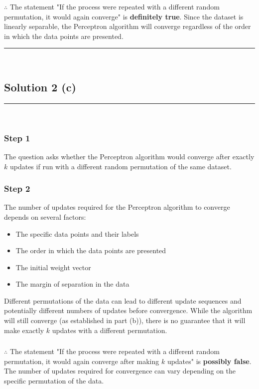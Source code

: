 \documentclass{article}
\begin{document}
\subsubsection*{\normalfont}{$\therefore$ The statement "If the process were repeated with a different random permutation, it would again converge" is \textbf{definitely true}. Since the dataset is linearly separable, the Perceptron algorithm will converge regardless of the order in which the data points are presented.}

\noindent\rule{\textwidth}{0.4pt}\\

\newpage

\subsection*{Solution 2 (c)}
\noindent\rule{\textwidth}{0.4pt}\\

\subsubsection*{Step 1}
\parbox{\textwidth}{
The question asks whether the Perceptron algorithm would converge after exactly $k$ updates if run with a different random permutation of the same dataset.
}

\subsubsection*{Step 2}
\parbox{\textwidth}{
The number of updates required for the Perceptron algorithm to converge depends on several factors:
\begin{itemize}
    \item The specific data points and their labels
    \item The order in which the data points are presented
    \item The initial weight vector
    \item The margin of separation in the data
\end{itemize}

Different permutations of the data can lead to different update sequences and potentially different numbers of updates before convergence. While the algorithm will still converge (as established in part (b)), there is no guarantee that it will make exactly $k$ updates with a different permutation.
}

\subsubsection*{\normalfont}{$\therefore$ The statement "If the process were repeated with a different random permutation, it would again converge after making $k$ updates" is \textbf{possibly false}. The number of updates required for convergence can vary depending on the specific permutation of the data.}
\end{document}
